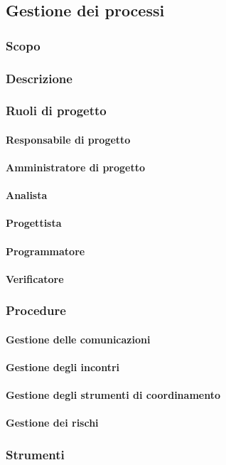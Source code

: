 \subsection{Gestione dei processi}

		\subsubsection{Scopo}

		\subsubsection{Descrizione}

		\subsubsection{Ruoli di progetto}
			\paragraph{Responsabile di progetto}
			\paragraph{Amministratore di progetto}
			\paragraph{Analista}
			\paragraph{Progettista}
			\paragraph{Programmatore}
			\paragraph{Verificatore}


		\subsubsection{Procedure}
			\paragraph{Gestione delle comunicazioni}
			\paragraph{Gestione degli incontri}
			\paragraph{Gestione degli strumenti di coordinamento}
			\paragraph{Gestione dei rischi}

		\subsubsection{Strumenti}